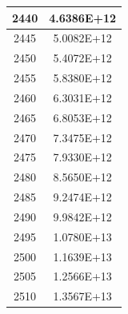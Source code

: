 \documentclass[a4paper]{article}
\begin{document}
\begin{tabular}{| c | c |}
    	2440 & 4.6386E+12 \\\hline
    	2445 & 5.0082E+12 \\\hline
    	2450 & 5.4072E+12 \\\hline
    	2455 & 5.8380E+12 \\\hline
    	2460 & 6.3031E+12 \\\hline
    	2465 & 6.8053E+12 \\\hline
    	2470 & 7.3475E+12 \\\hline
    	2475 & 7.9330E+12 \\\hline
    	2480 & 8.5650E+12 \\\hline
    	2485 & 9.2474E+12 \\\hline
    	2490 & 9.9842E+12 \\\hline
    	2495 & 1.0780E+13 \\\hline
    	2500 & 1.1639E+13 \\\hline
    	2505 & 1.2566E+13 \\\hline
    	2510 & 1.3567E+13 \\\hline
    \end{tabular}
    \hfill
\end{document}

